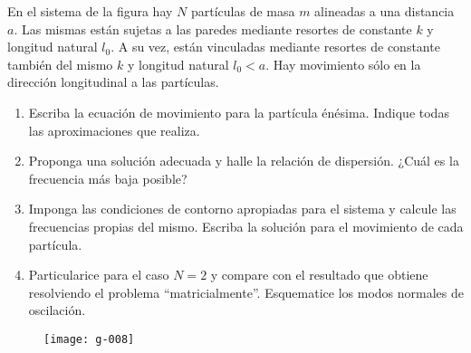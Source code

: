 \item
En el sistema de la figura hay \(N\) partículas de masa \(m\) alineadas a una distancia \(a\).
Las mismas están sujetas a las paredes mediante resortes de constante \(k\) y longitud natural \(l_0\).
A su vez, están vinculadas mediante resortes de constante también del mismo \(k\) y longitud natural \(l_0 < a\).
Hay movimiento sólo en la dirección longitudinal a las partículas.
\begin{enumerate}
	\item Escriba la ecuación de movimiento para la partícula énésima.
	Indique todas las aproximaciones que realiza.
	\item Proponga una solución adecuada y halle la relación de dispersión.
	¿Cuál es la frecuencia más baja posible?
	\item Imponga las condiciones de contorno apropiadas para el sistema y calcule las frecuencias propias del mismo.
	Escriba la solución para el movimiento de cada partícula.
	\item Particularice para el caso \(N = 2\) y compare con el resultado que obtiene resolviendo el problema ``matricialmente''.
	Esquematice los modos normales de oscilación.	
\end{enumerate}
\begin{figure}[h]
	\centering
	\texttt{[image: g-008]}
\end{figure}



